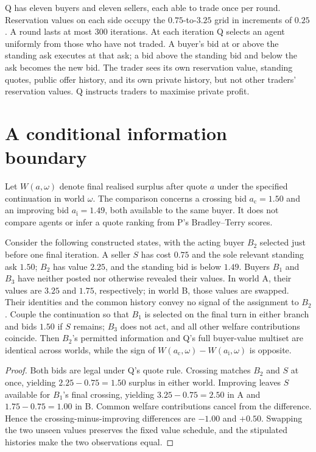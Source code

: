 \documentclass{article}
\begin{document}
Q has eleven buyers and eleven sellers, each able to trade once per round. Reservation values on each side
occupy the \(0.75\)-to-\(3.25\) grid in increments of \(0.25\). A round lasts at most 300 iterations. At each
iteration Q selects an agent uniformly from those who have not traded. A buyer's bid at or above the standing
ask executes at that ask; a bid above the standing bid and below the ask becomes the new bid. The trader sees
its own reservation value, standing quotes, public offer history, and its own private history, but not other
traders' reservation values. Q instructs traders to maximise private profit.

\section{A conditional information boundary}

Let \(W(a,\omega)\) denote final realised surplus after quote \(a\) under the specified continuation in world
\(\omega\). The comparison concerns a crossing bid \(a_{\mathrm{c}}=1.50\) and an improving bid
\(a_{\mathrm{i}}=1.49\), both available to the same buyer. It does not compare agents or infer a quote ranking
from P's Bradley--Terry scores.

\begin{proposition}
Consider the following constructed states, with the acting buyer \(B_2\) selected just before one final
iteration. A seller \(S\) has cost \(0.75\) and the sole relevant standing ask \(1.50\); \(B_2\) has value
\(2.25\), and the standing bid is below \(1.49\). Buyers \(B_1\) and \(B_3\) have neither posted nor otherwise
revealed their values. In world A, their values are \(3.25\) and \(1.75\), respectively; in world B, those
values are swapped. Their identities and the common history convey no signal of the assignment to \(B_2\).
Couple the continuation so that \(B_1\) is selected on the final turn in either branch and bids \(1.50\) if
\(S\) remains; \(B_3\) does not act, and all other welfare contributions coincide. Then \(B_2\)'s permitted
information and Q's full buyer-value multiset are identical across worlds, while the sign of
\(W(a_{\mathrm{c}},\omega)-W(a_{\mathrm{i}},\omega)\) is opposite.
\end{proposition}

\begin{proof}
Both bids are legal under Q's quote rule. Crossing matches \(B_2\) and \(S\) at once, yielding
\(2.25-0.75=1.50\) surplus in either world. Improving leaves \(S\) available for \(B_1\)'s final crossing,
yielding \(3.25-0.75=2.50\) in A and \(1.75-0.75=1.00\) in B. Common welfare contributions cancel from the
difference. Hence the crossing-minus-improving differences are \(-1.00\) and \(+0.50\). Swapping the two
unseen values preserves the fixed value schedule, and the stipulated histories make the two observations
equal.
\end{proof}
\end{document}
